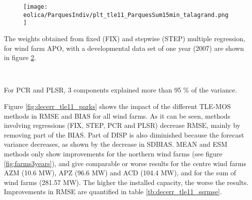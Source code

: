 \begin{figure}[!htp]
    \centering
    \texttt{[image: eolica/ParquesIndiv/plt\_tle11\_ParquesSum15min\_talagrand.png]}
    \label{fig:tle11_talagrand}
\end{figure}
\FloatBarrier


The weights obtained from fixed (FIX) and stepwise (STEP) multiple regression, for wind farm APO, with a developmental data set of one year (2007) are shown in figure \ref{fig:tle11_reg}.

\begin{figure}[!htp]
    \centering
    \\
    \label{fig:tle11_reg}
\end{figure}
\FloatBarrier

For PCR and PLSR, 3 components explained more than 95 \% of the variance.

Figure \ref{fig:decerr_tle11_parks} shows the impact of the different TLE-MOS methods in RMSE and BIAS for all wind farms. As it can be seen,  methods involving regressions (FIX, STEP, PCR and PLSR) decrease RMSE, mainly by removing part of the BIAS. Part of DISP is also diminished because the forecast variance decreases, as shown by the decrease in SDBIAS. MEAN and ESM methods only show improvements for the northern wind farms (see figure \ref{fig:farms3years}), and give comparable or worse results for the centre wind farms AZM (10.6 MW), APZ (96.6 MW) and ACD (104.4 MW), and for the sum of wind farms (281.57 MW). The higher the installed capacity, the worse the results. Improvements in RMSE are quantified in table \ref{tb:decerr_tle11_ssrmse}.

